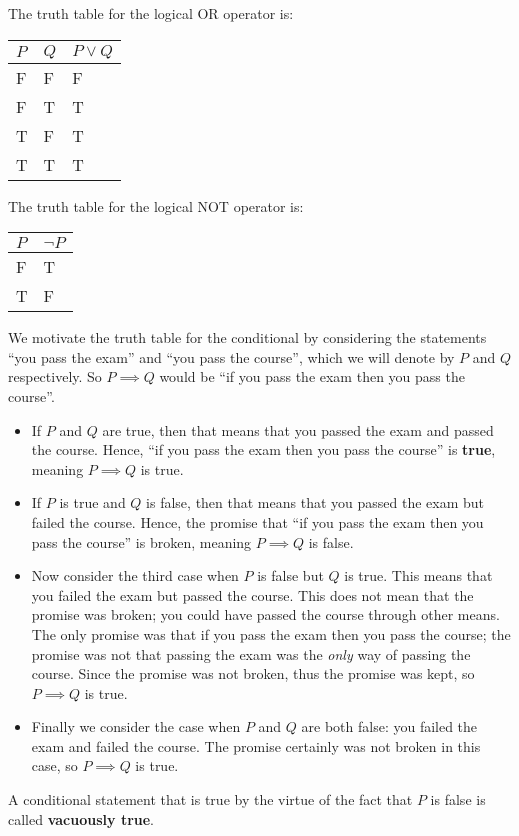 The truth table for the logical OR operator is:
\begin{table}[h]
    \centering
    \begin{tabular}{|l|l||l|}
        \hline
        $P$ & $Q$ & $P\lor Q$ \\ \hline
        F   & F   & F         \\ \hline
        F   & T   & T         \\ \hline
        T   & F   & T         \\ \hline
        T   & T   & T         \\ \hline
    \end{tabular}
\end{table}

The truth table for the logical NOT operator is:
\begin{table}[h]
    \centering
    \begin{tabular}{|l||l|}
        \hline
        $P$ & $\lnot P$ \\ \hline
        F   & T         \\ \hline
        T   & F         \\ \hline
    \end{tabular}
\end{table}

We motivate the truth table for the conditional by considering the statements ``you pass the exam'' and ``you pass the course'', which we will denote by $P$ and $Q$ respectively. So $P \implies Q$ would be ``if you pass the exam then you pass the course''.
\begin{itemize}
    \item If $P$ and $Q$ are true, then that means that you passed the exam and passed the course. Hence, ``if you pass the exam then you pass the course'' is \textbf{true}, meaning $P \implies Q$ is true.
    \item If $P$ is true and $Q$ is false, then that means that you passed the exam but failed the course. Hence, the promise that ``if you pass the exam then you pass the course'' is broken, meaning $P \implies Q$ is false.
    \item Now consider the third case when $P$ is false but $Q$ is true. This means that you failed the exam but passed the course. This does not mean that the promise was broken; you could have passed the course through other means. The only promise was that if you pass the exam then you pass the course; the promise was not that passing the exam was the \textit{only} way of passing the course. Since the promise was not broken, thus the promise was kept, so $P \implies Q$ is true.
    \item Finally we consider the case when $P$ and $Q$ are both false: you failed the exam and failed the course. The promise certainly was not broken in this case, so $P \implies Q$ is true.
\end{itemize}
\begin{remark}
    A conditional statement that is true by the virtue of the fact that $P$ is false is called \textbf{vacuously true}.
\end{remark}

